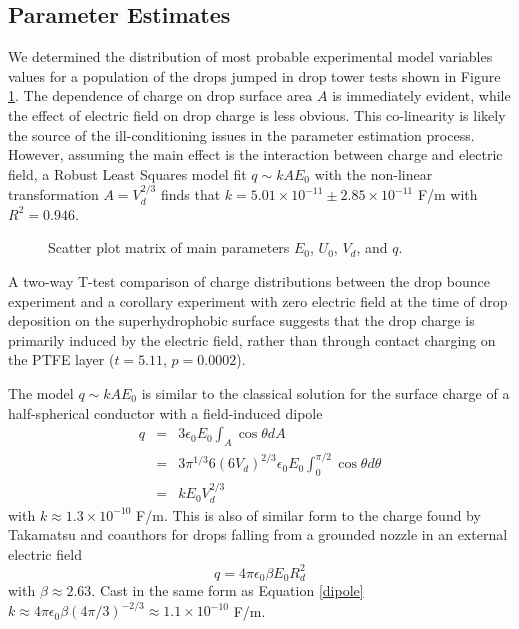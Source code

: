 \documentclass[aip,reprint, floatfix]{revtex4-1}
\begin{document}
\subsection{Parameter Estimates}
We determined the distribution of most probable experimental model variables values for a population of the drops jumped in drop tower tests shown in Figure \ref{fig:scatter}. The dependence of charge on drop surface area $A$ is immediately evident, while the effect of electric field on drop charge is less obvious. This co-linearity is likely the source of the ill-conditioning issues in the parameter estimation process. However, assuming the main effect is the interaction between charge and electric field, a Robust Least Squares model fit $q \sim kAE_0$ with the non-linear transformation $A = V_d^{2/3}$ finds that $k=5.01 \times 10^{-11} \pm  2.85 \times 10^{-11}$ F/m with $R^2 = 0.946$. 
\begin{figure}[h]
    \centering
    \resizebox{0.5\textwidth}{!}{}
    \caption{Scatter plot matrix of main parameters $E_0$, $U_0$, $V_d$, and $q$.\label{fig:scatter}}
\end{figure}

A two-way T-test comparison of charge distributions between the drop bounce experiment and a corollary experiment with zero electric field at the time of drop deposition on the superhydrophobic surface suggests that the drop charge is primarily induced by the electric field, rather than through contact charging on the PTFE layer ($t = 5.11$, $p = 0.0002$).

The model $q \sim kAE_0$ is similar to the classical solution for the surface charge of a half-spherical conductor with a field-induced dipole \cite{david_j._griffiths_introduction_1999}
\begin{eqnarray}
q &=& 3 \epsilon_0 E_0 \int_A \cos \theta dA \nonumber \\
&=& 3 \pi^{1/3} 6 \left(6 V_d \right)^{2/3} \epsilon_0 E_0 \int^{\pi / 2}_{0} \!\!\!\!\! \cos \theta d\theta \nonumber \\
&=& k E_0 V_d^{2/3} \label{dipole}
\end{eqnarray}
with $k \approx 1.3 \times 10^{-10}$ F/m. This is also of similar form to the charge found by Takamatsu and coauthors for drops falling from a grounded nozzle in an external electric field \cite{takamatsu_theoretical_1981}
\[q = 4 \pi \epsilon_0 \beta E_0 R_d^2 \]
with $\beta \approx 2.63$. Cast in the same form as Equation \ref{dipole} $k \approx 4 \pi \epsilon_0 \beta (4 \pi/3)^{-2/3} \approx 1.1 \times 10^{-10}$ F/m.
\end{document}
